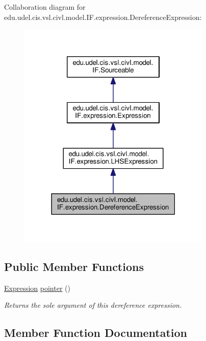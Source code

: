 Collaboration diagram for edu.\+udel.\+cis.\+vsl.\+civl.\+model.\+I\+F.\+expression.\+Dereference\+Expression\+:
\nopagebreak
\begin{figure}[H]
\begin{center}
\leavevmode
\includegraphics[width=261pt]{interfaceedu_1_1udel_1_1cis_1_1vsl_1_1civl_1_1model_1_1IF_1_1expression_1_1DereferenceExpression__coll__graph}
\end{center}
\end{figure}
\subsection*{Public Member Functions}
\begin{DoxyCompactItemize}
\item 
\hyperlink{interfaceedu_1_1udel_1_1cis_1_1vsl_1_1civl_1_1model_1_1IF_1_1expression_1_1Expression}{Expression} \hyperlink{interfaceedu_1_1udel_1_1cis_1_1vsl_1_1civl_1_1model_1_1IF_1_1expression_1_1DereferenceExpression_aa01a942d6ff63eb43a2897a52bc763bb}{pointer} ()
\begin{DoxyCompactList}\small\item\em Returns the sole argument of this dereference expression. \end{DoxyCompactList}\end{DoxyCompactItemize}


\subsection{Member Function Documentation}
\hypertarget{interfaceedu_1_1udel_1_1cis_1_1vsl_1_1civl_1_1model_1_1IF_1_1expression_1_1DereferenceExpression_aa01a942d6ff63eb43a2897a52bc763bb}{}
